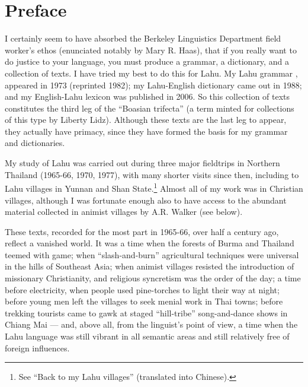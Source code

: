 \vspace{0.25em}

\renewcommand{\thefootnote}{\arabic{footnote}}
\setcounter{footnote}{0}


\section*{Preface}
I certainly seem to have absorbed the Berkeley Linguistics Department
field worker's ethos (enunciated notably by Mary R. Haas), that if you
really want to do justice to your language, you must produce a grammar,
a dictionary, and a collection of texts. I have tried my best to do this
for Lahu. My Lahu grammar \citep[abbreviated ``GL'']{matisoff1973grammar}, appeared in 1973 (reprinted 1982); my
Lahu-English dictionary \citep[abbreviated ``DL'']{88} came out in 1988; and my English-Lahu
lexicon \citep[abbreviated ``ELL'']{matisoff2006english} was published in 2006. So this collection of texts
constitutes the third leg of the ``Boasian trifecta'' (a term minted for collections of this type by Liberty Lidz).
Although these texts are the
last leg to appear, they actually have primacy, since they have formed
the basis for my grammar and dictionaries.

My study of Lahu was carried out during three major fieldtrips in
Northern Thailand (1965-66, 1970, 1977), with many shorter visits since
then, including to Lahu villages in Yunnan and Shan State.\footnote{See
\citet{matisoff2008} ``Back to my Lahu villages'' (translated into Chinese).} Almost all of my
work was in Christian villages, although I was fortunate enough also to
have access to the abundant material collected in animist villages by
A.R. Walker (see below).

These texts, recorded for the most part in 1965-66, over half a century
ago, reflect a vanished world. It was a time when the forests of Burma and
Thailand teemed with game; when ``slash-and-burn'' agricultural techniques
were universal in the hills of Southeast Asia; when animist villages
resisted the introduction of missionary Christianity, and religious
syncretism was the order of the day; a time before electricity, when
people used pine-torches to light their way at night; before young men
left the villages to seek menial work in Thai towns; before trekking
tourists came to gawk at staged ``hill-tribe'' song-and-dance shows in
Chiang Mai --- and, above all, from the linguist's point of view, a
time when the Lahu language was still vibrant in all semantic areas and
still relatively free of foreign influences.

